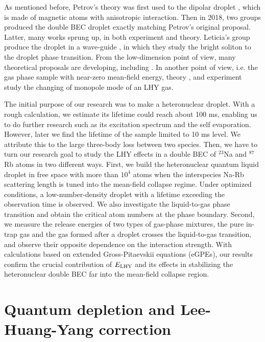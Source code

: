 As mentioned before, Petrov's theory was first used to the dipolar droplet \cite{ferrier2016Liquid,chomaz2016}, which is made of magnetic atoms with anisotropic interaction. Then in 2018, two groups \cite{cabrera2018quantum,semeghini2018self} produced the double BEC droplet exactly matching Petrov's original proposal. Latter, many works sprung up, in both experiment and theory. Leticia's group produce the droplet in a wave-guide \cite{cheiney2018bright}, in which they study the bright soliton to the droplet phase transition. From the low-dimension point of view, many theoretical proposals are developing, including \cite{petrov2016ultradilute,Ilg2018,Cui2021}. In another point of view, i.e. the gas phase sample with near-zero mean-field energy, theory \cite{Jorgensen2018}, and experiment \cite{skov2020} study the changing of monopole mode of an LHY gas. 

The initial purpose of our research was to make a heteronuclear droplet. With a rough calculation, we estimate its lifetime could reach about 100 ms, enabling us to do further research such as its excitation spectrum and the self evaporation. However, later we find the lifetime of the sample limited to 10 ms level. We attribute this to the large three-body loss between two species. Then, we have to turn our research goal to study the LHY effects in a double BEC of $^{23}$Na and $^{87}$Rb atoms in two different ways. First, we build the heteronuclear quantum liquid droplet in free space with more than $10^4$ atoms when the interspecies Na-Rb scattering length is tuned into the mean-field collapse regime. Under optimized conditions, a low-number-density droplet with a lifetime exceeding the observation time is observed. We also investigate the liquid-to-gas phase transition and obtain the critical atom numbers at the phase boundary. Second, we measure the release energies of two types of gas-phase mixtures, the pure in-trap gas and the gas formed after a droplet crosses the liquid-to-gas transition, and observe their opposite dependence on the interaction strength.  With calculations based on extended Gross-Pitaevskii equations (eGPEs), our results confirm the crucial contribution of $E_{\rm LHY}$ and its effects in stabilizing the heteronuclear double BEC far into the mean-field collapse region.

\section{Quantum depletion and Lee-Huang-Yang correction}
\label{sec:intro-LHY}

